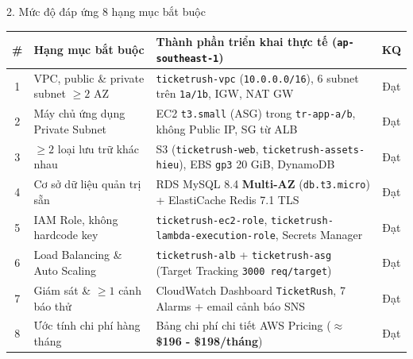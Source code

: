 \documentclass[aspectratio=169,11pt]{beamer}
\begin{document}
\begin{frame}{2. Mức độ đáp ứng 8 hạng mục bắt buộc}
  \scriptsize
  \renewcommand{\arraystretch}{1.15}
  \begin{tabular}{@{} c >{\raggedright\arraybackslash}p{4.1cm} >{\raggedright\arraybackslash}p{7.8cm} c @{}}
    \toprule
    \textbf{\#} & \textbf{Hạng mục bắt buộc} & \textbf{Thành phần triển khai thực tế (\texttt{ap-southeast-1})} & \textbf{KQ} \\
    \midrule
    1 & VPC, public \& private subnet $\ge 2$ AZ & \texttt{ticketrush-vpc} (\texttt{10.0.0.0/16}), 6 subnet trên \texttt{1a/1b}, IGW, NAT GW & Đạt \\
    2 & Máy chủ ứng dụng Private Subnet & EC2 \texttt{t3.small} (ASG) trong \texttt{tr-app-a/b}, không Public IP, SG từ ALB & Đạt \\
    3 & $\ge 2$ loại lưu trữ khác nhau & S3 (\texttt{ticketrush-web}, \texttt{ticketrush-assets-hieu}), EBS \texttt{gp3} 20 GiB, DynamoDB & Đạt \\
    4 & Cơ sở dữ liệu quản trị sẵn & RDS MySQL 8.4 \textbf{Multi-AZ} (\texttt{db.t3.micro}) + ElastiCache Redis 7.1 TLS & Đạt \\
    5 & IAM Role, không hardcode key & \texttt{ticketrush-ec2-role}, \texttt{ticketrush-lambda-execution-role}, Secrets Manager & Đạt \\
    6 & Load Balancing \& Auto Scaling & \texttt{ticketrush-alb} + \texttt{ticketrush-asg} (Target Tracking \texttt{3000 req/target}) & Đạt \\
    7 & Giám sát \& $\ge 1$ cảnh báo thử & CloudWatch Dashboard \texttt{TicketRush}, 7 Alarms + email cảnh báo SNS & Đạt \\
    8 & Ước tính chi phí hàng tháng & Bảng chi phí chi tiết AWS Pricing (\textbf{$\approx$ \$196 - \$198/tháng}) & Đạt \\
    \bottomrule
  \end{tabular}
\end{frame}
\end{document}
